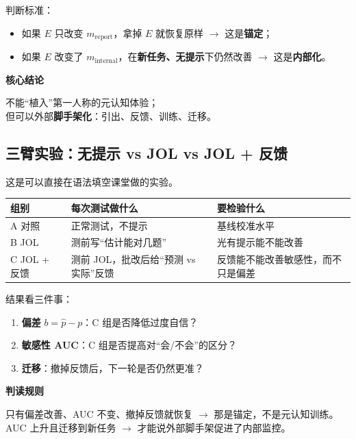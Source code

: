 \documentclass[UTF8,a4paper,11pt]{ctexart}
\newenvironment{explainbox}[1]
{\begin{center}\begin{minipage}{0.94\textwidth}\colorbox{boxbg}{\parbox{0.92\textwidth}{\textbf{#1}\par\vspace{2pt}}}}
{\end{minipage}\end{center}}
\begin{document}
判断标准：

\begin{itemize}[leftmargin=2em]
\item 如果 $E$ 只改变 $m_{\text{report}}$，拿掉 $E$ 就恢复原样 $\to$ 这是\textbf{锚定}；
\item 如果 $E$ 改变了 $m_{\text{internal}}$，在\textbf{新任务、无提示}下仍然改善 $\to$ 这是\textbf{内部化}。
\end{itemize}

\begin{explainbox}{核心结论}
不能“植入”第一人称的元认知体验；\\
但可以外部\textbf{脚手架化}：引出、反馈、训练、迁移。
\end{explainbox}

\subsection{三臂实验：无提示 vs JOL vs JOL + 反馈}

这是可以直接在语法填空课堂做的实验。

\begin{center}
\begin{longtable}{@{}p{2.4cm}p{4.4cm}p{7.0cm}@{}}
\toprule
\textbf{组别} & \textbf{每次测试做什么} & \textbf{要检验什么} \\
\midrule
A 对照 & 正常测试，不提示 & 基线校准水平 \\
B JOL & 测前写“估计能对几题” & 光有提示能不能改善 \\
C JOL + 反馈 & 测前 JOL，批改后给“预测 vs 实际”反馈 & 反馈能不能改善敏感性，而不只是偏差 \\
\bottomrule
\end{longtable}
\end{center}

结果看三件事：

\begin{enumerate}[leftmargin=2em]
\item \textbf{偏差} $b=\hat p-p$：C 组是否降低过度自信？
\item \textbf{敏感性 AUC}：C 组是否提高对“会/不会”的区分？
\item \textbf{迁移}：撤掉反馈后，下一轮是否仍然更准？
\end{enumerate}

\begin{explainbox}{判读规则}
只有偏差改善、AUC 不变、撤掉反馈就恢复 $\to$ 那是锚定，不是元认知训练。\\
AUC 上升且迁移到新任务 $\to$ 才能说外部脚手架促进了内部监控。
\end{explainbox}
\end{document}
